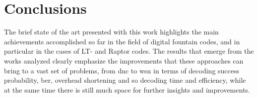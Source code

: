 \section{Conclusions}
The brief state of the art presented with this work highlights the main achievements accomplished so far in the field of digital fountain codes, and in particular in the cases of LT- and Raptor codes. The results that emerge from the works analyzed clearly emphasize the improvements that these approaches can bring to a vast set of problems, from \gls{dnc} to \gls{wsn} in terms of decoding success probability, \gls{ber}, overhead shortening and so decoding time and efficiency, while at the same time there is still much space for further insights and improvements.
